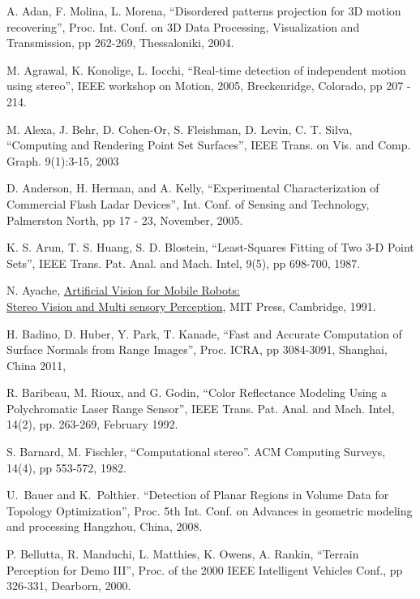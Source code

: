 \documentclass[twocolumn,oneside]{book}
\begin{document}

\begin{thebibliography}{99}

A. Adan, F. Molina, L. Morena, 
``Disordered patterns projection for 3D motion recovering'',
Proc. Int. Conf. on 
3D Data Processing, Visualization and Transmission, pp 262-269, Thessaloniki, 2004.

M. Agrawal, K. Konolige, L. Iocchi,
``Real-time detection of independent motion using stereo'', 
IEEE workshop on Motion, 2005, Breckenridge, Colorado, pp 207 - 214.

M. Alexa, J. Behr, D. Cohen-Or, S. Fleishman, D. Levin,  C. T. Silva,
``Computing and Rendering Point Set Surfaces'',
IEEE Trans. on Vis. and Comp. Graph. 9(1):3-15, 2003

D. Anderson, H. Herman, and A. Kelly,
``Experimental Characterization of Commercial Flash Ladar Devices'',
Int. Conf. of Sensing and Technology, Palmerston North, pp 17 - 23, November, 2005. 

K. S. Arun, T. S. Huang, S. D. Blostein,
``Least-Squares Fitting of Two 3-D Point Sets'', 
IEEE Trans. Pat. Anal. and Mach. Intel, 9(5), pp 698-700, 1987.

N. Ayache,
{\underline {Artificial Vision for Mobile Robots:}}\\{\underline {Stereo Vision and Multi sensory Perception}},
MIT Press, Cambridge, 1991.

H. Badino, D. Huber, Y. Park, T. Kanade,
``Fast and Accurate Computation of Surface Normals from Range Images'',
Proc. ICRA, pp 3084-3091, Shanghai, China 2011,

R. Baribeau, M. Rioux, and G. Godin, 
``Color Reflectance Modeling Using a Polychromatic Laser Range Sensor'',
IEEE Trans. Pat. Anal. and Mach. Intel, 14(2), pp. 263-269, February 1992.

S. Barnard, M. Fischler,
``Computational stereo''.
ACM Computing Surveys, 14(4), pp 553-572, 1982.

U.~Bauer and K.~Polthier.
``Detection of Planar Regions in Volume Data for Topology Optimization'',
Proc. 5th Int. Conf. on Advances in geometric modeling and processing
Hangzhou, China, 2008.

P. Bellutta, R. Manduchi, L. Matthies, K. Owens, A. Rankin, 
``Terrain Perception for Demo III'', 
Proc. of the 2000 IEEE Intelligent Vehicles Conf., pp 326-331, Dearborn, 2000.


\end{thebibliography}
\end{document}
